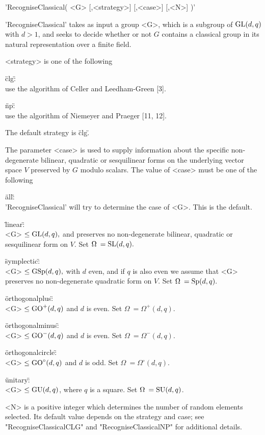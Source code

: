 'RecogniseClassical( <G> [,<strategy>] [,<case>] [,<N>] )'

'RecogniseClassical'  takes as input a group  <G>, which is a subgroup of
${\rm GL}(d,q)$ with $d > 1$, and seeks to decide  whether or not $G$ contains
a classical group in its natural representation over a finite field.

<strategy> is one of the following\:\

\"clg\":\\
    use the algorithm of Celler and Leedham-Green [3].

\"np\":\\
    use the algorithm of  Niemeyer and Praeger [11,  12].  

The default strategy is \"clg\".

The parameter <case>  is used  to  supply information about the  specific
non-degenerate   bilinear,    quadratic or   sesquilinear  forms   on the
underlying  vector space $V$ preserved  by $G$ modulo scalars.  The value
of <case> must be one of the following\:\

\"all\":\\
    'RecogniseClassical' will try to determine  the case of <G>.  This is
    the default.
    
\"linear\":\\
    <G>  $\le {\rm GL}(d,q),$  and   preserves  no  non-degenerate   bilinear,
   quadratic or sesquilinear form on $V.$ Set $\Omega \:= {\rm SL}(d,q).$
    
\"symplectic\":\\
   <G> $\le {\rm GSp}(d,q),$ with $d$ even, and if $q$  is also even we assume
   that   <G> preserves no  non-degenerate    quadratic form on  $V.$ Set
   $\Omega \:= {\rm Sp}(d,q).$

\"orthogonalplus\":\\
    <G> $\le {\rm GO}^+(d,q)$ and $d$ is even. Set $\Omega \:= \Omega^+(d,q).$

\"orthogonalminus\":\\
    <G> $\le {\rm GO}^-(d,q)$ and $d$ is even. Set $\Omega \:= \Omega^-(d,q).$

\"orthogonalcircle\":\\
    <G>   $\le    {\rm GO}^\circ(d,q)$  and  $d$  is   odd.  Set   $\Omega \:=
   \Omega^\circ(d,q).$
    
\"unitary\":\\
    <G>   $\le {\rm GU}(d,q)$,   where  $q$  is  a   square.   Set $\Omega \:=
    {\rm SU}(d,q)$.

<N> is a positive integer which determines the  number of random elements
selected. Its default   value depends  on  the  strategy  and  case;  see
"RecogniseClassicalCLG"  and "RecogniseClassicalNP"   for      additional
details.

